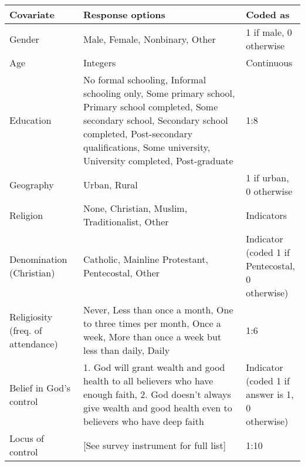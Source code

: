 \begin{table}[H]
\small
\begin{adjustbox}{totalheight=.9\baselineskip}
\begin{tabular}{p{0.25\linewidth}p{0.55\linewidth}p{0.3\linewidth}}
\textbf{Covariate}                   & \textbf{Response options} & \textbf{Coded as}                                     \\
\hline
Gender                                      & Male,   Female, Nonbinary, Other                           & 1 if male, 0 otherwise  \\
Age                                         & Integers                                                   & Continuous              \\
Education &
  No   formal schooling, Informal schooling only, Some primary school, Primary   school completed, Some secondary school, Secondary school completed,   Post-secondary qualifications, Some university, University completed,   Post-graduate &
  1:8 \\
Geography                                   & Urban, Rural                                 & 1 if urban, 0 otherwise \\
Religion                                    & None,   Christian, Muslim, Traditionalist, Other                           & Indicators              \\
Denomination (Christian)  & Catholic, Mainline Protestant, Pentecostal, Other  & Indicator (coded 1 if Pentecostal, 0 otherwise)\\
Religiosity   (freq. of attendance) &
  Never,   Less than once a month, One to three times per month, Once a week, More than   once a week but less than daily, Daily &
  1:6 \\
 Belief in God's control & 1. God will grant wealth and good health to all believers who have enough faith, 2. God doesn't always give wealth and good health even to believers who have deep faith & Indicator (coded 1 if answer is 1, 0 otherwise)\\
 Locus of control & 
[See survey instrument for full list] & 1:10\\

\end{tabular}
\end{adjustbox}
\end{table}
